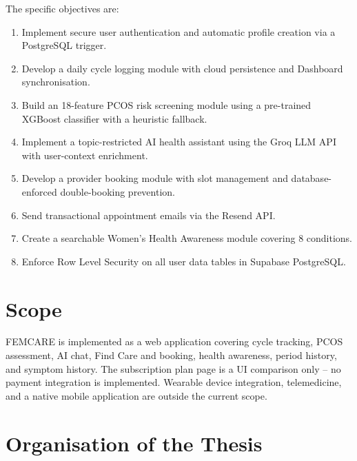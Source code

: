 The specific objectives are:

\begin{enumerate}
    \item Implement secure user authentication and automatic profile creation via a PostgreSQL trigger.
    \item Develop a daily cycle logging module with cloud persistence and Dashboard synchronisation.
    \item Build an 18-feature PCOS risk screening module using a pre-trained XGBoost classifier with a heuristic fallback.
    \item Implement a topic-restricted AI health assistant using the Groq LLM API with user-context enrichment.
    \item Develop a provider booking module with slot management and database-enforced double-booking prevention.
    \item Send transactional appointment emails via the Resend API.
    \item Create a searchable Women's Health Awareness module covering 8 conditions.
    \item Enforce Row Level Security on all user data tables in Supabase PostgreSQL.
\end{enumerate}

\section{Scope}
\label{sec:scope}

FEMCARE is implemented as a web application covering cycle tracking, PCOS assessment, AI chat, Find Care and booking, health awareness, period history, and symptom history. The subscription plan page is a UI comparison only -- no payment integration is implemented. Wearable device integration, telemedicine, and a native mobile application are outside the current scope.

\section{Organisation of the Thesis}
\label{sec:organisation}

